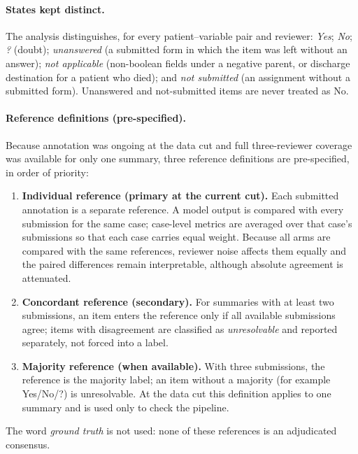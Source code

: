 \paragraph{States kept distinct.} The analysis distinguishes, for every patient--variable pair and
reviewer: \emph{Yes}; \emph{No}; \emph{?} (doubt); \emph{unanswered} (a submitted form in which the item
was left without an answer); \emph{not applicable} (non-boolean fields under a negative parent, or
discharge destination for a patient who died); and \emph{not submitted} (an assignment without a
submitted form). Unanswered and not-submitted items are never treated as No.

\paragraph{Reference definitions (pre-specified).} Because annotation was ongoing at the data cut and
full three-reviewer coverage was available for only one summary, three reference definitions are
pre-specified, in order of priority:
\begin{enumerate}
\item \textbf{Individual reference (primary at the current cut).} Each submitted annotation is
a separate reference. A model output is compared with every submission for the same case; case-level
metrics are averaged over that case's submissions so that each case carries equal weight. Because all
arms are compared with the same references, reviewer noise affects them equally and the paired
differences remain interpretable, although absolute agreement is attenuated.
\item \textbf{Concordant reference (secondary).} For summaries with at least two submissions, an item
enters the reference only if all available submissions agree; items with disagreement are classified
as \emph{unresolvable} and reported separately, not forced into a label.
\item \textbf{Majority reference (when available).} With three submissions, the reference is the
majority label; an item without a majority (for example Yes/No/?) is unresolvable. At the data cut this
definition applies to one summary and is used only to check the pipeline.
\end{enumerate}
The word \emph{ground truth} is not used: none of these references is an adjudicated consensus.

